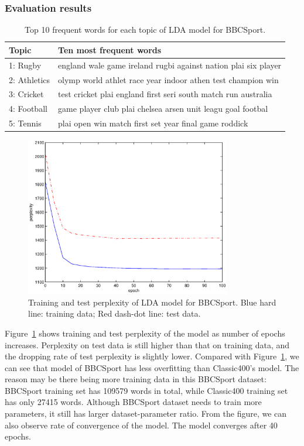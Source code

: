 \documentclass{article} %
\begin{document}
\subsubsection{Evaluation results}
\begin{table}
\centering
    \begin{tabular}{|l|l|}
    \hline
    Topic        & Ten most frequent words                                                   \\ \hline
    1: Rugby     & england  wale  game  ireland  rugbi  against  nation  plai  six  player   \\ \hline
    2: Athletics & olymp  world  athlet  race  year  indoor  athen  test  champion  win      \\ \hline
    3: Cricket   & test  cricket  plai  england  first  seri  south  match  run  australia   \\ \hline
    4:  Football & game  player  club  plai  chelsea  arsen  unit  leagu  goal  footbal      \\ \hline
    5: Tennis    & plai  open  win  match  first  set  year  final  game  roddick            \\ \hline
    \end{tabular}
    \caption{Top 10 frequent words for each topic of LDA model for BBCSport.}
    \label{table6}
\end{table}
\begin{figure}
\centering
\includegraphics[width=0.8\textwidth]{perplex2}
\caption{Training and test perplexity of LDA model for BBCSport. Blue hard line: training data; Red dash-dot line: test data.}
\label{per2}
\end{figure}
Figure~\ref{per2} shows training and test perplexity of the model as number of epochs increases. Perplexity on test data is still higher than that on training data, and the dropping rate of test perplexity is slightly lower. Compared with Figure~\ref{per2}, we can see that model of BBCSport has less overfitting than Classic400's model. The reason may be there being more training data in this BBCSport dataset: BBCSport training set has 109579 words in total, while Classic400 training set has only 27415 words. Although BBCSport dataset needs to train more parameters, it still has larger dataset-parameter ratio. From the figure, we can also observe rate of convergence of the model. The model converges after 40 epochs.
\end{document}
